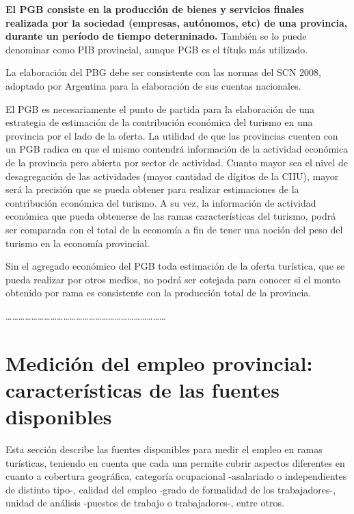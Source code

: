 \documentclass[
  openany]{book}
\begin{document}
\textbf{El PGB consiste en la producción de bienes y servicios finales realizada por la sociedad (empresas, autónomos, etc) de una provincia, durante un período de tiempo determinado.} También se lo puede denominar como PIB provincial, aunque PGB es el título más utilizado.

La elaboración del PBG debe ser consistente con las normas del SCN 2008, adoptado por Argentina para la elaboración de sus cuentas nacionales.

El PGB es necesariamente el punto de partida para la elaboración de una estrategia de estimación de la contribución económica del turismo en una provincia por el lado de la oferta. La utilidad de que las provincias cuenten con un PGB radica en que el mismo contendrá información de la actividad económica de la provincia pero abierta por sector de actividad. Cuanto mayor sea el nivel de desagregación de las actividades (mayor cantidad de dígitos de la CIIU), mayor será la precisión que se pueda obtener para realizar estimaciones de la contribución económica del turismo. A su vez, la información de actividad económica que pueda obtenerse de las ramas características del turismo, podrá ser comparada con el total de la economía a fin de tener una noción del peso del turismo en la economía provincial.

Sin el agregado económico del PGB toda estimación de la oferta turística, que se pueda realizar por otros medios, no podrá ser cotejada para conocer si el monto obtenido por rama es consistente con la producción total de la provincia.

\ldots\ldots\ldots\ldots\ldots\ldots\ldots\ldots\ldots\ldots\ldots\ldots\ldots\ldots\ldots\ldots\ldots\ldots\ldots\ldots\ldots\ldots\ldots\ldots\ldots{}

\hypertarget{mediciuxf3n-del-empleo-provincial-caracteruxedsticas-de-las-fuentes-disponibles}{%
\section{Medición del empleo provincial: características de las fuentes disponibles}\label{mediciuxf3n-del-empleo-provincial-caracteruxedsticas-de-las-fuentes-disponibles}}

Esta sección describe las fuentes disponibles para medir el empleo en ramas turísticas, teniendo en cuenta que cada una permite cubrir aspectos diferentes en cuanto a cobertura geográfica, categoría ocupacional -asalariado o independientes de distinto tipo-, calidad del empleo -grado de formalidad de los trabajadores-, unidad de análisis -puestos de trabajo o trabajadores-, entre otros.
\end{document}
